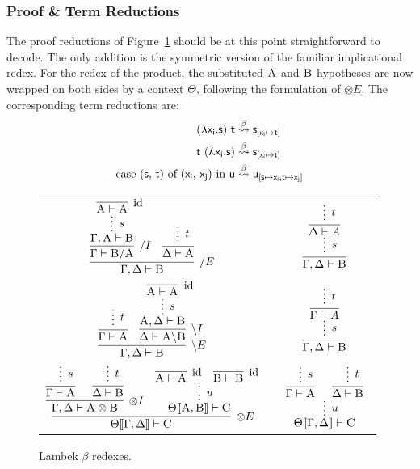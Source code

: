 \subsubsection{Proof \& Term Reductions}
The proof reductions of Figure~\ref{figure:lambek_proof_reductions} should be at this point straightforward to decode.
The only addition is the symmetric version of the familiar implicational redex.
For the redex of the product, the substituted $\smallprop{A}$ and $\smallprop{B}$ hypotheses are now wrapped on both sides by a context $\Theta$, following the formulation of $\otimes E$.
The corresponding term reductions are:
\begin{align*}
(\term{\lambda x_i.s})~\term{t} & \overset{\beta}{\leadsto} \term{s}_{[\term{x_i} \mapsto \term{t}]}\\
\term{t}~(\term{\adbmal x_i.s}) & \overset{\beta}{\leadsto} \term{s}_{[\term{x_i} \mapsto \term{t}]}\\
\cterm{case (\smallterm{s}, \smallterm{t}) of (\smallterm{x_i}, \smallterm{x_j}) in \smallterm{u}} & \overset{\beta}{\leadsto} \term{u_{[\term{s} \mapsto \term{x_i}, \term{t} \mapsto \term{x_j}]}}\\
\end{align*}

\begin{figure}
	\centering
	\begin{tabularx}{0.95\textwidth}{@{}ccc@{}}
	$\infer[\divright E]{\Gamma, \Delta \vdash \prop{B}}{
	\infer[\divright I]{\Gamma \vdash \prop{B} \divright \prop{A}}{
		\infer*[s]{\Gamma, \prop{A} \vdash \prop{B}}{
				\infer[\Ax]{\prop{A} \vdash \prop{A}}{} 
			}
		}
		&
		\infer{\Delta \vdash \prop{A}}{
			\infer*[t]{}{}
		}
	}$
	&
	\raisebox{20pt}{$\implies$}
	&
	$ 
	\infer[]{\Gamma, \Delta \vdash \prop{B}}{
		\infer*[s]{}{
		\infer[]{\Delta \vdash A}{
			\infer*[t]{}{}
		}}
	}
	$\\[\smallsep]
	$\infer[\divleft E]{\Gamma, \Delta \vdash \prop{B}}{
		\infer{\Gamma \vdash \prop{A}}{
			\infer*[t]{}{}
		}
		&
		\infer[\divleft I]{\Delta \vdash \prop{A} \divleft \prop{B}}{
			\infer*[s]{\prop{A}, \Delta \vdash \prop{B}}{
				\infer[\Ax]{\prop{A} \vdash \prop{A}}{} 
			}
		}
	}$
	&
	\raisebox{20pt}{$\implies$}
	&
	$ 
	\infer[]{\Gamma, \Delta \vdash \prop{B}}{
		\infer*[s]{}{
		\infer[]{\Gamma \vdash A}{
			\infer*[t]{}{}
		}}
	}
	$\\[\smallsep]
	$
	\infer[\otimes E]{\Theta\ctx{\Gamma, \Delta} \vdash \prop{C}}{
		\infer[\otimes I]{\Gamma, \Delta \vdash \prop{A} \otimes \prop{B}}{
			\infer[]{\Gamma \vdash \prop{A}}{\infer*[s]{}{}}
			&
			\infer[]{\Delta \vdash \prop{B}}{\infer*[t]{}{}}
		}		
		&
		\infer*[u]{\Theta\ctx{\prop{A}, \prop{B}} \vdash \prop{C}}{
			\infer[\Ax]{\prop{A} \vdash \prop{A}}{}
			& 
			\infer[\Ax]{\prop{B} \vdash \prop{B}}{}
		}
	}
	$
	&
	\raisebox{20pt}{$\implies$}
	&
	$
	\infer*[u]{\Theta\ctx{\Gamma, \Delta} \vdash \prop{C}}{
		\infer[]{\Gamma \vdash \prop{A}}{
			\infer*[s]{}{}
		}
		&
		\infer[]{\Delta \vdash \prop{B}}{
			\infer*[t]{}{}
		}
	}
	$
	\end{tabularx}
	\caption{Lambek $\beta$ redexes.}
	\label{figure:lambek_proof_reductions}
\end{figure}

